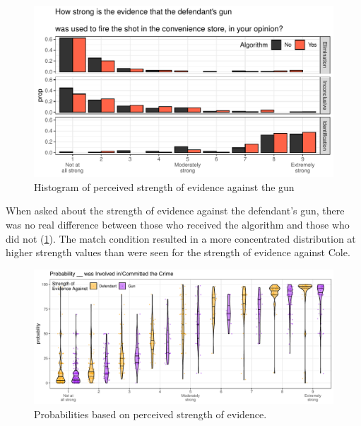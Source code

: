 \documentclass[print]{nuthesis}
\begin{document}
\begin{figure}

{\centering \includegraphics[width=\linewidth]{thesis_files/figure-latex/gunstrength-1} 

}

\caption{Histogram of perceived strength of evidence against the gun}\label{fig:gunstrength}
\end{figure}

When asked about the strength of evidence against the defendant's gun, there was no real difference between those who received the algorithm and those who did not (\ref{fig:gunstrength}).
The match condition resulted in a more concentrated distribution at higher strength values than were seen for the strength of evidence against Cole.

\begin{figure}

{\centering \includegraphics[width=\linewidth]{thesis_files/figure-latex/probstrength-1} 

}

\caption{Probabilities based on perceived strength of evidence.}\label{fig:probstrength}
\end{figure}
\end{document}
